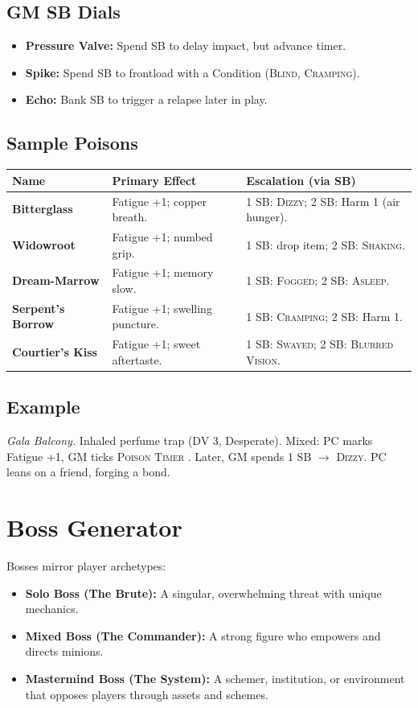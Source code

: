 \subsection*{GM SB Dials}
\begin{itemize}
    \item \textbf{Pressure Valve:} Spend SB to delay impact, but advance timer.
    \item \textbf{Spike:} Spend SB to frontload with a Condition (\textsc{Blind}, \textsc{Cramping}).
    \item \textbf{Echo:} Bank SB to trigger a relapse later in play.
\end{itemize}

\subsection*{Sample Poisons}
\begin{tabularx}{\linewidth}{>{\bfseries}l X X}
\toprule
Name & Primary Effect & Escalation (via SB) \\
\midrule
Bitterglass & Fatigue +1; copper breath. & 1 SB: \textsc{Dizzy}; 2 SB: Harm 1 (air hunger). \\
Widowroot & Fatigue +1; numbed grip. & 1 SB: drop item; 2 SB: \textsc{Shaking}. \\
Dream-Marrow & Fatigue +1; memory slow. & 1 SB: \textsc{Fogged}; 2 SB: \textsc{Asleep}. \\
Serpent's Borrow & Fatigue +1; swelling puncture. & 1 SB: \textsc{Cramping}; 2 SB: Harm 1. \\
Courtier's Kiss & Fatigue +1; sweet aftertaste. & 1 SB: \textsc{Swayed}; 2 SB: \textsc{Blurred Vision}. \\
\bottomrule
\end{tabularx}

\subsection*{Example}
\emph{Gala Balcony.} Inhaled perfume trap (DV 3, Desperate). Mixed: PC marks Fatigue +1, GM ticks \textsc{Poison Timer }. Later, GM spends 1 SB $\to$ \textsc{Dizzy}. PC leans on a friend, forging a bond.

\newpage
\section{Boss Generator}\label{sec:boss_generator}

Bosses mirror player archetypes:
\begin{itemize}
    \item \textbf{Solo Boss (The Brute):} A singular, overwhelming threat with unique mechanics.
    \item \textbf{Mixed Boss (The Commander):} A strong figure who empowers and directs minions.
    \item \textbf{Mastermind Boss (The System):} A schemer, institution, or environment that opposes players through assets and schemes.
\end{itemize}

